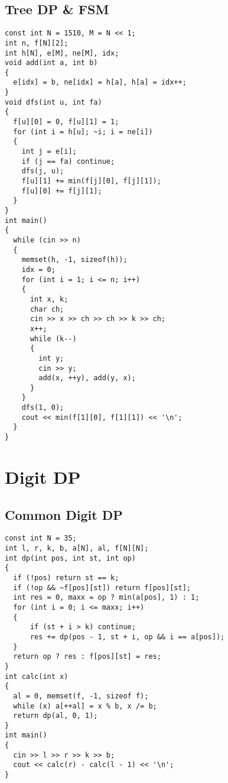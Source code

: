 \subsection{Tree DP \& FSM}
\begin{lstlisting}
const int N = 1510, M = N << 1;
int n, f[N][2];
int h[N], e[M], ne[M], idx;
void add(int a, int b)
{
  e[idx] = b, ne[idx] = h[a], h[a] = idx++;
}
void dfs(int u, int fa)
{
  f[u][0] = 0, f[u][1] = 1;
  for (int i = h[u]; ~i; i = ne[i])
  {
    int j = e[i];
    if (j == fa) continue;
    dfs(j, u);
    f[u][1] += min(f[j][0], f[j][1]);
    f[u][0] += f[j][1];
  }
}
int main()
{
  while (cin >> n)
  {
    memset(h, -1, sizeof(h));
    idx = 0;
    for (int i = 1; i <= n; i++)
    {
      int x, k;
      char ch;
      cin >> x >> ch >> ch >> k >> ch;
      x++;
      while (k--)
      {
        int y;
        cin >> y;
        add(x, ++y), add(y, x);
      }
    }
    dfs(1, 0);
    cout << min(f[1][0], f[1][1]) << '\n';
  }
}
\end{lstlisting}
\section{Digit DP}
\subsection{Common Digit DP}
\begin{lstlisting}
const int N = 35;
int l, r, k, b, a[N], al, f[N][N];
int dp(int pos, int st, int op)
{
  if (!pos) return st == k;
  if (!op && ~f[pos][st]) return f[pos][st];
  int res = 0, maxx = op ? min(a[pos], 1) : 1;
  for (int i = 0; i <= maxx; i++)
  {
      if (st + i > k) continue;
      res += dp(pos - 1, st + i, op && i == a[pos]);
  }
  return op ? res : f[pos][st] = res;
}
int calc(int x)
{
  al = 0, memset(f, -1, sizeof f);
  while (x) a[++al] = x % b, x /= b;
  return dp(al, 0, 1);
}
int main()
{
  cin >> l >> r >> k >> b;
  cout << calc(r) - calc(l - 1) << '\n';
}
\end{lstlisting}
